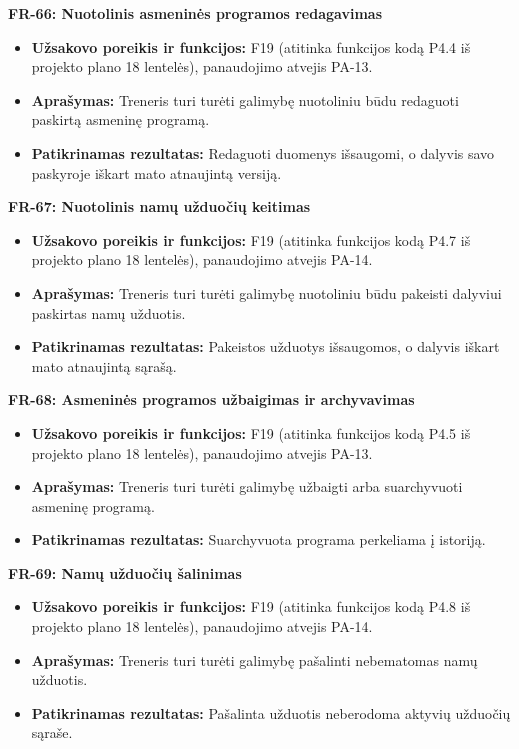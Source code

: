 \vspace{0.3cm}
\noindent\textbf{FR-66: Nuotolinis asmeninės programos redagavimas}
\begin{itemize}
    \item \textbf{Užsakovo poreikis ir funkcijos:} F19 (atitinka funkcijos kodą P4.4 iš projekto plano 18 lentelės), panaudojimo atvejis PA-13.
    \item \textbf{Aprašymas:} Treneris turi turėti galimybę nuotoliniu būdu redaguoti paskirtą asmeninę programą.
    \item \textbf{Patikrinamas rezultatas:} Redaguoti duomenys išsaugomi, o dalyvis savo paskyroje iškart mato atnaujintą versiją.
\end{itemize}

\vspace{0.3cm}
\noindent\textbf{FR-67: Nuotolinis namų užduočių keitimas}
\begin{itemize}
    \item \textbf{Užsakovo poreikis ir funkcijos:} F19 (atitinka funkcijos kodą P4.7 iš projekto plano 18 lentelės), panaudojimo atvejis PA-14.
    \item \textbf{Aprašymas:} Treneris turi turėti galimybę nuotoliniu būdu pakeisti dalyviui paskirtas namų užduotis.
    \item \textbf{Patikrinamas rezultatas:} Pakeistos užduotys išsaugomos, o dalyvis iškart mato atnaujintą sąrašą.
\end{itemize}

\vspace{0.3cm}
\noindent\textbf{FR-68: Asmeninės programos užbaigimas ir archyvavimas}
\begin{itemize}
    \item \textbf{Užsakovo poreikis ir funkcijos:} F19 (atitinka funkcijos kodą P4.5 iš projekto plano 18 lentelės), panaudojimo atvejis PA-13.
    \item \textbf{Aprašymas:} Treneris turi turėti galimybę užbaigti arba suarchyvuoti asmeninę programą.
    \item \textbf{Patikrinamas rezultatas:} Suarchyvuota programa perkeliama į istoriją.
\end{itemize}

\vspace{0.3cm}
\noindent\textbf{FR-69: Namų užduočių šalinimas}
\begin{itemize}
    \item \textbf{Užsakovo poreikis ir funkcijos:} F19 (atitinka funkcijos kodą P4.8 iš projekto plano 18 lentelės), panaudojimo atvejis PA-14.
    \item \textbf{Aprašymas:} Treneris turi turėti galimybę pašalinti nebematomas namų užduotis.
    \item \textbf{Patikrinamas rezultatas:} Pašalinta užduotis neberodoma aktyvių užduočių sąraše.
\end{itemize}


